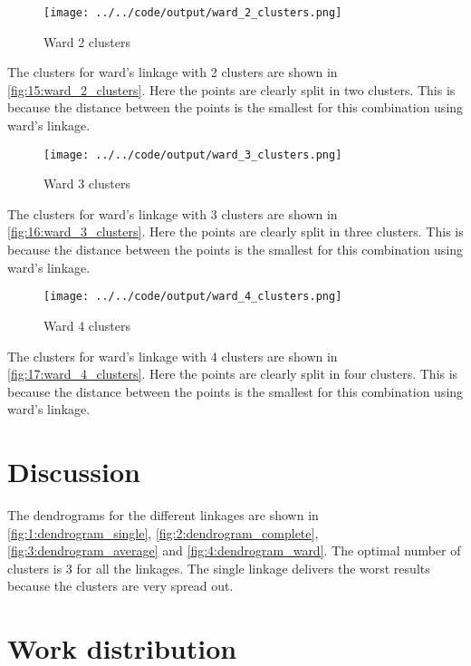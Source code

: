 \documentclass[twoside, a4paper, fleqn, reqno]{article}
\begin{document}
\begin{figure}[H]
	\centering
	\texttt{[image: ../../code/output/ward\_2\_clusters.png]}
	\caption{Ward 2 clusters}
	\label{fig:15:ward_2_clusters}
\end{figure}

The clusters for ward's linkage with 2 clusters are shown in \autoref{fig:15:ward_2_clusters}.
Here the points are clearly split in two clusters.
This is because the distance between the points is the smallest for this combination using ward's linkage.

\begin{figure}[H]
	\centering
	\texttt{[image: ../../code/output/ward\_3\_clusters.png]}
	\caption{Ward 3 clusters}
	\label{fig:16:ward_3_clusters}
\end{figure}

The clusters for ward's linkage with 3 clusters are shown in \autoref{fig:16:ward_3_clusters}.
Here the points are clearly split in three clusters.
This is because the distance between the points is the smallest for this combination using ward's linkage.

\begin{figure}[H]
	\centering
	\texttt{[image: ../../code/output/ward\_4\_clusters.png]}
	\caption{Ward 4 clusters}
	\label{fig:17:ward_4_clusters}
\end{figure}

The clusters for ward's linkage with 4 clusters are shown in \autoref{fig:17:ward_4_clusters}.
Here the points are clearly split in four clusters.
This is because the distance between the points is the smallest for this combination using ward's linkage.

\section{Discussion}

The dendrograms for the different linkages are shown in \autoref{fig:1:dendrogram_single}, \autoref{fig:2:dendrogram_complete}, \autoref{fig:3:dendrogram_average} and \autoref{fig:4:dendrogram_ward}.
The optimal number of clusters is 3 for all the linkages.
The single linkage delivers the worst results because the clusters are very spread out.


\section{Work distribution}

\end{document}
